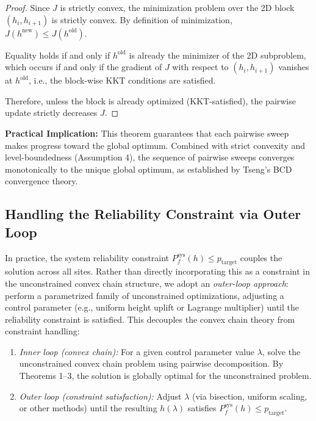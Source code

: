 \documentclass[12pt]{article}
\theoremstyle{definition}
\begin{document}
\begin{proof}
Since $J$ is strictly convex, the minimization problem over the 2D block $(h_i, h_{i+1})$ is strictly convex. By definition of minimization, $J(h^{\text{new}}) \leq J(h^{\text{old}})$.

Equality holds if and only if $h^{\text{old}}$ is already the minimizer of the 2D subproblem, which occurs if and only if the gradient of $J$ with respect to $(h_i, h_{i+1})$ vanishes at $h^{\text{old}}$, i.e., the block-wise KKT conditions are satisfied.

Therefore, unless the block is already optimized (KKT-satisfied), the pairwise update strictly decreases $J$.
\end{proof}

\noindent\textbf{Practical Implication:} This theorem guarantees that each pairwise sweep makes progress toward the global optimum. Combined with strict convexity and level-boundedness (Assumption 4), the sequence of pairwise sweeps converges monotonically to the unique global optimum, as established by Tseng's BCD convergence theory.

\subsection*{Handling the Reliability Constraint via Outer Loop}

In practice, the system reliability constraint $P_f^{\text{sys}}(h) \leq p_{\text{target}}$ couples the solution across all sites. Rather than directly incorporating this as a constraint in the unconstrained convex chain structure, we adopt an \emph{outer-loop approach}: perform a parametrized family of unconstrained optimizations, adjusting a control parameter (e.g., uniform height uplift or Lagrange multiplier) until the reliability constraint is satisfied. This decouples the convex chain theory from constraint handling:

\begin{enumerate}
    \item \emph{Inner loop (convex chain):} For a given control parameter value $\lambda$, solve the unconstrained convex chain problem using pairwise decomposition. By Theorems 1–3, the solution is globally optimal for the unconstrained problem.

    \item \emph{Outer loop (constraint satisfaction):} Adjust $\lambda$ (via bisection, uniform scaling, or other methods) until the resulting $h(\lambda)$ satisfies $P_f^{\text{sys}}(h) \leq p_{\text{target}}$.
\end{enumerate}
\end{document}
